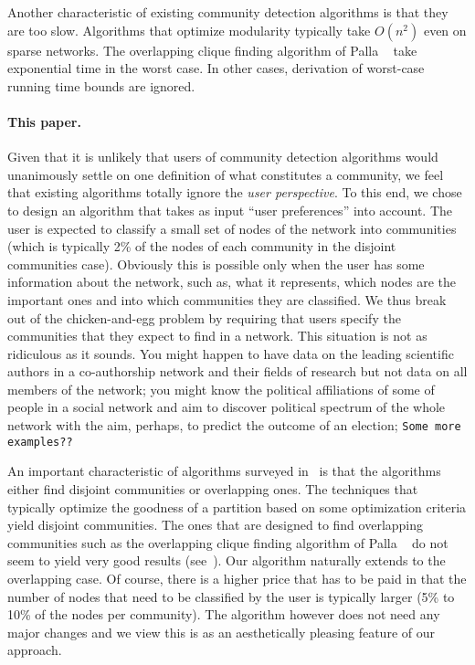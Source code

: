 Another characteristic of existing community detection algorithms 
is that they are too slow. Algorithms that optimize modularity typically 
take $O(n^2)$ even on sparse networks. The overlapping clique finding 
algorithm of Palla \etal~\cite{PDFV05} take exponential time in the worst case.
In other cases, derivation of worst-case running time bounds are ignored. 

\paragraph{This paper.}
Given that it is unlikely that users of community detection algorithms 
would unanimously settle on one definition of what constitutes a community, 
we feel that existing algorithms totally ignore the \emph{user perspective}. To this 
end, we chose to design an algorithm that takes as input ``user preferences'' into 
account. The user is expected to classify a small set of nodes of the network 
into communities (which is typically 2\% of the nodes of each community in 
the disjoint communities case). Obviously this is possible only when the user has some 
information about the network, such as, what it represents, which nodes 
are the important ones and into which communities they are classified. We thus 
break out of the chicken-and-egg problem  by requiring that users specify 
the communities that they expect to find in a network. This situation is not 
as ridiculous as it sounds. You might happen to have data on the leading scientific 
authors in a co-authorship network and their fields of research but not data on 
all members of the network; you might know the political affiliations of
some of people in a social network and aim to discover political spectrum of 
the whole network with the aim, perhaps, to predict the outcome of an election;
\texttt{Some more examples??}


An important characteristic of algorithms surveyed in~\cite{LF09} 
is that the algorithms either find disjoint communities or overlapping 
ones. The techniques that typically optimize the goodness of a partition based 
on some optimization criteria yield disjoint communities. The ones that are 
designed to find overlapping communities such as the overlapping clique finding 
algorithm of Palla \etal~\cite{PDFV05} do not seem to yield very good results (see~\cite{LF09}).
Our algorithm naturally extends to the overlapping case. Of course, there is a higher 
price that has to be paid in that the number of nodes that need to be classified by the user 
is typically larger (5\% to 10\% of the nodes per community). The algorithm however 
does not need any major changes and we view this is as an aesthetically pleasing 
feature of our approach. 

